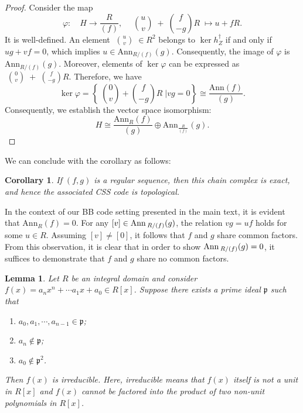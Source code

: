 \documentclass[aps,prl,english,superscriptaddress,twocolumn,tightenlines,showpacs,longbibliography,floatfix,amsfonts]{revtex4-2}
\newtheorem{lem}{Lemma}
\newtheorem{cor}{Corollary}
\newcommand{\Ann}[1]{{\operatorname{Ann} \, #1}}
\begin{document}
\begin{proof}
	Consider the map
	\begin{equation}
		\varphi: \quad  H \to \frac{R}{(f)}, \quad \;{u \choose v}\; + \;{f \choose -g}R\; \mapsto u + fR.
	\end{equation}
	It is well-defined. An element $\;{u \choose v}\;\in R^2$ belongs to $\ker h_Z^\dagger$ if and only if $ug+vf=0$, which implies $u \in \mathrm{Ann}_{R/(f)}(g)$. Consequently, the image of $\varphi$ is $\mathrm{Ann}_{R/(f)}(g)$. Moreover, elements of $\ker\varphi$ can be expressed as $\;{0 \choose v}\;+\;{f \choose -g}R$. Therefore, we have \begin{equation}
		\ker\varphi = \left\{\;{0 \choose v}+{f \choose -g}R\; \bigg|vg=0\right\} \cong \frac{\mathrm{Ann}(f)}{(g)}.
	\end{equation} 
	Consequently, we establish the vector space isomorphism:
	\begin{equation}
		H \cong \frac{\mathrm{Ann}_R(f)}{(g)} \oplus \mathrm{Ann}_{\frac{R}{(f)}}(g).
	\end{equation}
\end{proof}
We can conclude with the corollary as follows:
\begin{cor}\label{thm:topo_condition}
	If $(f,g)$ is a regular sequence, then this chain complex is exact, and hence the associated CSS code is topological.
\end{cor}

In the context of our BB code setting presented in the main text, it is evident that $\mathrm{Ann}_R(f)=0$. For any $[v] \in \mathrm{\Ann}_{R/(f)}(g)$, the relation $vg = uf$ holds for some $u\in R$. Assuming $[v]\neq [0]$, it follows that $f$ and $g$ share common factors. From this observation, it is clear that in order to show $\mathrm{\Ann}_{R/(f)}(g)=0$, it suffices to demonstrate that $f$ and $g$ share no common factors.
\begin{lem}\label{lem:Eisenstein}
	Let $R$ be an integral domain and consider $f(x)=a_n x^n+\cdots a_1 x + a_0 \in R[x]$. Suppose there exists a prime ideal $\mathfrak{p}$ such that 
	\begin{enumerate}
		\item $a_0, a_1, \cdots, a_{n-1} \in \mathfrak{p}$;
		\item $a_n \notin \mathfrak{p}$;
		\item $a_0 \notin \mathfrak{p}^2$.
	\end{enumerate}
	Then $f(x)$ is irreducible. Here, irreducible means that $f(x)$ itself is not a unit in $R[x]$ and $f(x)$ cannot be factored into the product of two non-unit polynomials in $R[x]$. 
\end{lem}
\end{document}
